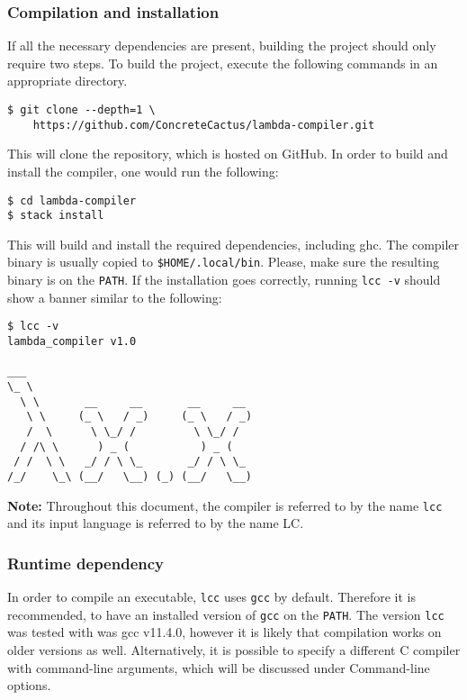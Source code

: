 \documentclass[12pt]{article}
\begin{document}
\subsubsection{Compilation and installation}

If all the necessary dependencies are present, building the project should only
require two steps. To build the project, execute the following commands in an
appropriate directory.
\begin{lstlisting}
$ git clone --depth=1 \
    https://github.com/ConcreteCactus/lambda-compiler.git
\end{lstlisting}
This will clone the repository, which is hosted on GitHub. In order to build and
install the compiler, one would run the following:
\begin{lstlisting}
$ cd lambda-compiler
$ stack install
\end{lstlisting}
This will build and install the required dependencies, including ghc. The
compiler binary is usually copied to \texttt{\$HOME/.local/bin}. Please, make
sure the resulting binary is on the \texttt{PATH}. If the installation goes
correctly, running \texttt{lcc -v} should show a banner similar to the
following:

\noindent\begin{minipage}{\textwidth}
\begin{lstlisting}
$ lcc -v
lambda_compiler v1.0

___
\_ \
  \ \       __     __       __     __
   \ \     (_ \   / _)     (_ \   / _)
   /  \      \ \_/ /         \ \_/ /
  / /\ \      ) _ (           ) _ (
 / /  \ \   _/ / \ \_       _/ / \ \_
/_/    \_\ (__/   \__) (_) (__/   \__)
\end{lstlisting}
\end{minipage}
\textbf{Note:} Throughout this document, the compiler is referred to by the name
\texttt{lcc} and its input language is referred to by the name LC.

\subsubsection{Runtime dependency}

In order to compile an executable, \texttt{lcc} uses \texttt{gcc} by default.
Therefore it is recommended, to have an installed version of \texttt{gcc} on the
\texttt{PATH}. The version \texttt{lcc} was tested with was gcc v11.4.0, however
it is likely that compilation works on older versions as well. Alternatively, it
is possible to specify a different C compiler with command-line arguments, which
will be discussed under Command-line options.
\end{document}
